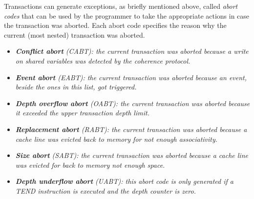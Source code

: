 \documentclass{article}
\begin{document}
            Transactions can generate exceptions, as briefly mentioned above, called \textit{abort codes} that can be used by the programmer to take the appropriate actions in case the transaction was aborted. Each abort code specifies the reason why the current (most nested) transaction was aborted.

            \begin{itemize}

                \item \textit{\textbf{Conflict abort} (CABT): the current transaction was aborted because a write on shared variables was detected by the coherence protocol.}

                \item \textit{\textbf{Event abort} (EABT): the current transaction was aborted because an event, beside the ones in this list, got triggered.}

                \item \textit{\textbf{Depth overflow abort} (OABT): the current transaction was aborted because it exceeded the upper transaction depth limit.}

                \item \textit{\textbf{Replacement abort} (RABT): the current transaction was aborted because a cache line was evicted back to memory for not enough associativity.}

                \item \textit{\textbf{Size abort} (SABT): the current transaction was aborted because a cache line was evicted for back to memory not enough space.}

                \item \textit{\textbf{Depth underflow abort} (UABT): this abort code is only generated if a TEND instruction is executed and the depth counter is zero.}

            \end{itemize}
\end{document}
